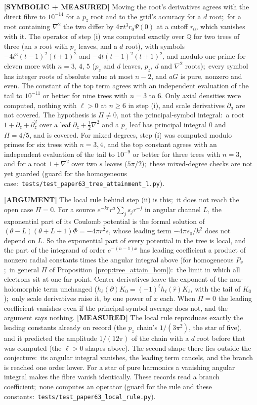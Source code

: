 \documentclass[aps,pra,twocolumn,superscriptaddress,longbibliography]{revtex4-2}
\begin{document}
\textbf{[SYMBOLIC + MEASURED]} Moving the root's derivatives agrees with the
direct fibre to $10^{-14}$ for a $p_z$ root and to the grid's accuracy for a
$d$ root;\ for a root containing $\nabla^2$ the two differ by
$4\pi t^3r_0\Psi(0)$ at a cutoff $r_0$, which vanishes with it.  The operator
of step (i) was computed exactly over $\mathbb{Q}$ for two trees of three
(an $s$ root with $p_z$ leaves, and a $d$ root), with symbols $-4t^3(t-1)^2(t+1)^2$ and
$-4t(t-1)^2(t+1)^2$, and modulo one prime for eleven more with $n=3$, $4$,
$5$ ($p_z$ and $d$ leaves, $p_z$, $d$ and $\nabla^2$ roots);\ every symbol has
integer roots of absolute value at most $n-2$, and $aG$ is pure, nonzero and
even.  The constant of the top term agrees with an independent evaluation of
the tail to $10^{-11}$ or better for nine trees with $n=3$ to $6$.  Only axial
densities were computed, nothing with $\ell>0$ at $n\ge6$ in step (i), and
scale derivatives $\partial_a$ are not covered.  The hypothesis is $\Pi\neq0$, not the
principal-symbol integral:\ a root $1+\partial_z+\partial_z^2$ over a leaf
$\partial_z+\tfrac12\nabla^2$ and a $p_z$ leaf has principal integral $0$ and $\Pi=4/5$, and is
covered.  For mixed degrees, step (i) was computed modulo primes for six trees with $n=3,4$,
and the top constant agrees with an independent evaluation of the tail to $10^{-9}$ or better
for three trees with $n=3$, and for a root $1+\nabla^2$ over two $s$ leaves ($5\pi/2$);\ these
mixed-degree checks are not yet guarded (guard for the homogeneous case:\
\texttt{tests/test\_paper63\_tree\_attainment\_l.py}).

\textbf{[ARGUMENT]} The local rule behind step (ii) is this;\ it does not reach the open case $\Pi=0$.
For a source $e^{-kr}r^{a}\sum_js_jr^{-j}$ in angular channel $L$, the
exponential part of its Coulomb potential is the formal solution of
$(\theta-L)(\theta+L+1)\Phi=-4\pi r^2s$, whose leading term $-4\pi s_0/k^2$
does not depend on $L$.  So the exponential part of every potential in the
tree is local, and the part of the integrand of order $e^{-(n-1)x}$ has
leading coefficient a product of nonzero radial constants times the angular
integral above (for homogeneous $P_v$;\ in general $\Pi$ of
Proposition~\ref{prop:tree_attain_hom}):\ the limit in which all electrons sit at one far point.  Center derivatives leave the
exponent of the non-holomorphic term unchanged ($h_\ell(\partial)K_0=(-1)^\ell
h_\ell(\hat r)K_\ell$, with the tail of $K_0$);\ only scale derivatives raise it, by
one power of $x$ each.  When $\Pi=0$ the leading coefficient vanishes even if the
principal-symbol average does not, and the argument says nothing.  \textbf{[MEASURED]} The local rule reproduces exactly
the leading constants already on record (the $p_z$ chain's $1/(3\pi^2)$, the star of
five), and it predicted the amplitude $1/(12\pi)$ of the chain with a $d$ root
before that was computed (the $\ell>0$ shapes above).  The second shape there lies outside
the conjecture:\ its angular integral vanishes, the leading term cancels, and
the branch is reached one order lower.  For a star of pure harmonics a
vanishing angular integral makes the fibre vanish identically.  These records
read a branch coefficient;\ none computes an operator (guard for the rule and
these constants:\ \texttt{tests/test\_paper63\_local\_rule.py}).
\end{document}

